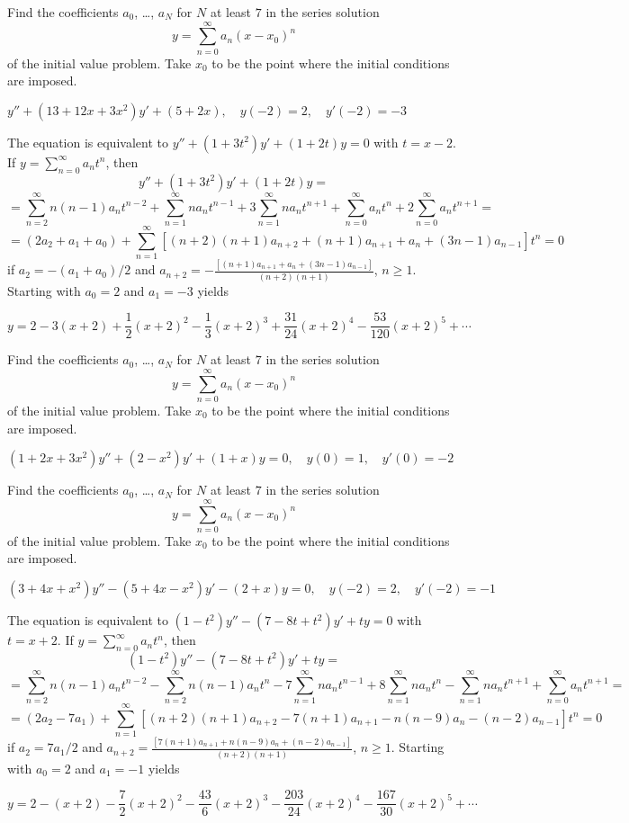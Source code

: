 \documentclass{ximera}
\begin{document}
\begin{problem}\label{exer:7.3.44}
Find
the coefficients  $a_0$, \dots, $a_N$ for $N$ at least $7$
in the series solution
$$
y=\sum_{n=0}^\infty a_n(x-x_0)^n
$$
of the initial value problem. Take $x_0$ to be the point where the
initial conditions are imposed.

$y''+(13+12x+3x^2)y'+(5+2x),\quad y(-2)=2,\quad y'(-2)=-3$

\begin{solution}
     The equation is equivalent to
 $y''+(1+3t^2)y'+(1+2t)y=0$ with $t=x-2$.
If $y=\sum_{n=0}^\infty a_nt^n$, then
$$y''+(1+3t^2)y'+(1+2t)y=$$
$$=\sum_{n=2}^\infty n(n-1)a_nt^{n-2}
+\sum_{n=1}^\infty na_nt^{n-1}
+3\sum_{n=1}^\infty na_nt^{n+1}
+\sum_{n=0}^\infty a_nt^n
+2\sum_{n=0}^\infty a_nt^{n+1}=$$
$$=(2a_2+a_1+a_0)+
\sum_{n=1}^\infty[(n+2)(n+1)a_{n+2}+
(n+1)a_{n+1}+a_n+(3n-1)a_{n-1}]t^n=0$$ if $a_2=-(a_1+a_0)/2$ and
$a_{n+2}=-\frac{[(n+1)a_{n+1}+a_n+(3n-1)a_{n-1}]}{
(n+2)(n+1)}$,
$n\geq 1$. Starting with $a_0=2$ and $a_1=-3$ yields

$$y=2-3(x+2)+\frac{1}{2}(x+2)^2-\frac{1}{3}(x+2)^3+\frac{31}{24}(x+2)^4-
\frac{53}{120}(x+2)^5+\cdots$$
\end{solution}
\end{problem}

\begin{problem}\label{exer:7.3.45}
Find
the coefficients  $a_0$, \dots, $a_N$ for $N$ at least $7$
in the series solution
$$
y=\sum_{n=0}^\infty a_n(x-x_0)^n
$$
of the initial value problem. Take $x_0$ to be the point where the
initial conditions are imposed.

$(1+2x+3x^2)y''+(2-x^2)y'+(1+x)y=0,\quad y(0)=1,\quad y'(0)=-2$
\end{problem}

\begin{problem}\label{exer:7.3.46}
Find
the coefficients  $a_0$, \dots, $a_N$ for $N$ at least $7$
in the series solution
$$
y=\sum_{n=0}^\infty a_n(x-x_0)^n
$$
of the initial value problem. Take $x_0$ to be the point where the
initial conditions are imposed.

$(3+4x+x^2)y''-(5+4x-x^2)y'-(2+x)y=0,\quad y(-2)=2,\quad y'(-2)=-1$

\begin{solution}
     The equation is equivalent to
 $(1-t^2)y''-(7-8t+t^2)y'+ty=0$ with $t=x+2$.
If $y=\sum_{n=0}^\infty a_nt^n$, then
$$(1-t^2)y''-(7-8t+t^2)y'+ty=$$
$$=\sum_{n=2}^\infty n(n-1)a_nt^{n-2}
- \sum_{n=2}^\infty n(n-1)a_nt^n
-7\sum_{n=1}^\infty na_nt^{n-1}
+8\sum_{n=1}^\infty na_nt^n
-\sum_{n=1}^\infty na_nt^{n+1}
+\sum_{n=0}^\infty a_nt^{n+1}=$$
$$=(2a_2-7a_1)+
\sum_{n=1}^\infty[(n+2)(n+1)a_{n+2}
-7(n+1)a_{n+1}-n(n-9)a_n-(n-2)a_{n-1}]t^n=0$$ if $a_2=7a_1/2$
and
$a_{n+2}=\frac{[7(n+1)a_{n+1}+n(n-9)a_n+(n-2)a_{n-1}]}{
(n+2)(n+1)}$,
$n\ge1$. Starting with $a_0=2$ and $a_1=-1$ yields

$$y=2-(x+2)-\frac{7}{2}(x+2)^2-\frac{43}{6}(x+2)^3-\frac{203}{24}(x+2)^4-\frac{167
}{30}(x+2)^5+\cdots$$
\end{solution}
\end{problem}
\end{document}

